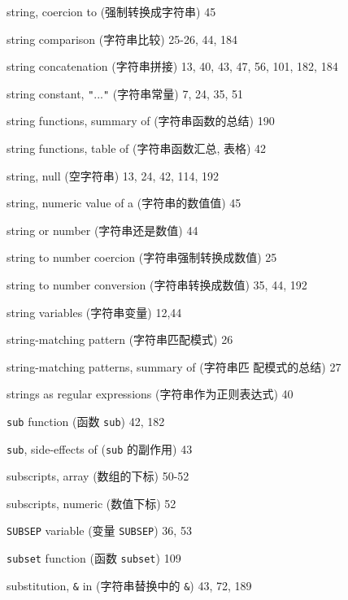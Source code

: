 \begin{multicols}{2}
\hangindent=2pc  string, coercion to (强制转换成字符串) 45

\hangindent=2pc  string comparison (字符串比较) 25-26, 44, 184

\hangindent=2pc  string concatenation (字符串拼接)
13, 40, 43,  47, 56, 101, 182, 184

\hangindent=2pc  string constant, \verb'"'...\verb'"' (字符串常量)
7, 24, 35, 51

\hangindent=2pc  string functions, summary of (字符串函数的总结) 190

\hangindent=2pc  string functions, table of (字符串函数汇总,
表格) 42

\hangindent=2pc  string, null (空字符串) 13, 24, 42, 114, 192

\hangindent=2pc  string, numeric value of a (字符串的数值值) 45

\hangindent=2pc  string or number (字符串还是数值) 44

\hangindent=2pc  string to number coercion (字符串强制转换成数值) 25

\hangindent=2pc  string to number conversion (字符串转换成数值)
35, 44, 192

\hangindent=2pc  string variables (字符串变量) 12,44

\hangindent=2pc  string-matching pattern (字符串匹配模式) 26

\hangindent=2pc  string-matching patterns, summary of (字符串匹 
配模式的总结) 27

\hangindent=2pc  strings as regular expressions
(字符串作为正则表达式) 40

\hangindent=2pc  \verb'sub' function (函数 \verb'sub') 42, 182

\hangindent=2pc  \verb'sub', side-effects of (\verb'sub'
的副作用) 43

\hangindent=2pc  subscripts, array (数组的下标) 50-52

\hangindent=2pc  subscripts, numeric (数值下标) 52

\hangindent=2pc  \verb'SUBSEP' variable (变量 \verb'SUBSEP') 36, 53

\hangindent=2pc  \verb'subset' function (函数 \verb'subset') 109

\hangindent=2pc  substitution, \verb'&' in (字符串替换中的
\verb'&') 43, 72, 189


\end{multicols}
